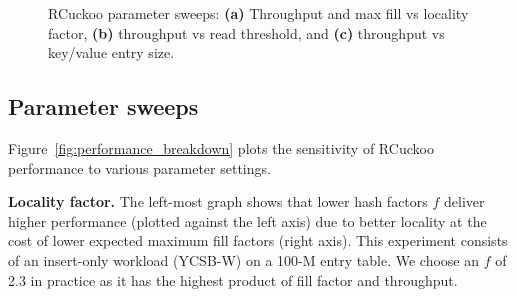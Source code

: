 \begin{figure}[t]
    \vspace{-1em}
    \caption{RCuckoo parameter sweeps:
      \textbf{(a)} Throughput and max fill vs locality factor,
          \textbf{(b)} throughput vs read threshold, and 
    \textbf{(c)} throughput vs key/value entry size.
    }
    \label{fig:performance_breakdown}
             \label{fig:entry_size}
\end{figure}





\subsection{Parameter sweeps}

Figure~\ref{fig:performance_breakdown} plots the sensitivity of
RCuckoo performance to various parameter settings.

\textbf{Locality factor.}  The left-most graph shows that lower hash
factors $f$ deliver higher performance (plotted against the left axis)
due to better locality at the cost of lower expected maximum fill
factors (right axis).
This experiment consists of an insert-only workload (YCSB-W)
on a 100-M entry table. We choose an $f$ of 2.3 in practice as
it has the highest product of fill factor and throughput.

